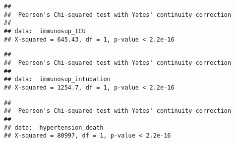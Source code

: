 \documentclass[
]{article}
\newenvironment{Shaded}{\begin{snugshade}}{\end{snugshade}}
\newcommand{\CommentTok}[1]{\textcolor[rgb]{0.56,0.35,0.01}{\textit{#1}}}
\newcommand{\FunctionTok}[1]{\textcolor[rgb]{0.00,0.00,0.00}{#1}}
\newcommand{\NormalTok}[1]{#1}
\newcommand{\OtherTok}[1]{\textcolor[rgb]{0.56,0.35,0.01}{#1}}
\newcommand{\SpecialCharTok}[1]{\textcolor[rgb]{0.00,0.00,0.00}{#1}}
\begin{document}
\begin{Shaded}
\end{Shaded}

\begin{verbatim}
## 
##  Pearson's Chi-squared test with Yates' continuity correction
## 
## data:  immunosup_ICU
## X-squared = 645.43, df = 1, p-value < 2.2e-16
\end{verbatim}

\begin{Shaded}
\end{Shaded}

\begin{verbatim}
## 
##  Pearson's Chi-squared test with Yates' continuity correction
## 
## data:  immunosup_intubation
## X-squared = 1254.7, df = 1, p-value < 2.2e-16
\end{verbatim}

\begin{Shaded}
\end{Shaded}

\begin{verbatim}
## 
##  Pearson's Chi-squared test with Yates' continuity correction
## 
## data:  hypertension_death
## X-squared = 80997, df = 1, p-value < 2.2e-16
\end{verbatim}
\end{document}
